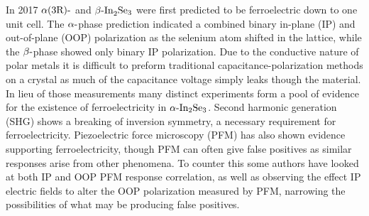 In 2017 $\textrm{\ensuremath{\alpha}(3R)-}$ and $\textrm{\ensuremath{\beta}-In}_{2}\textrm{Se}_{3}$
were first predicted to be ferroelectric down to one unit cell.\citep{ding2017prediction}
The $\textrm{\ensuremath{\alpha}-}$phase prediction indicated a combined
binary in-plane (IP) and out-of-plane (OOP) polarization as the selenium
atom shifted in the lattice, while the $\textrm{\ensuremath{\beta}-}$phase
showed only binary IP polarization. Due to the conductive nature of
polar metals it is difficult to preform traditional capacitance-polarization
methods on a crystal as much of the capacitance voltage simply leaks
though the material. In lieu of those measurements many distinct experiments
form a pool of evidence for the existence of ferroelectricity in $\textrm{\ensuremath{\alpha}-In}_{2}\textrm{Se}_{3}$.
Second harmonic generation (SHG) shows a breaking of inversion symmetry\citep{dai2020intrinsic,xiao2018intrinsic,zhou2017outofplane},
a necessary requirement for ferroelectricity. Piezoelectric force
microscopy (PFM) has also shown evidence supporting ferroelectricity\citep{cui2018intercorrelated,wan2018roomtemperature,hou2019alphaintextrm2setextrm3,hou2019resistive,dai2020intrinsic},
though PFM can often give false positives as similar responses arise
from other phenomena.\citep{vasudevan2017ferroelectric} To counter
this some authors have looked at both IP and OOP PFM response correlation\citep{hou2019alphaintextrm2setextrm3,dai2020intrinsic,hou2019resistive,xiao2018intrinsic,cui2018intercorrelated,liu2019atomically},
as well as observing the effect IP electric fields to alter the OOP
polarization measured by PFM\citep{hou2019alphaintextrm2setextrm3},
narrowing the possibilities of what may be producing false positives.

